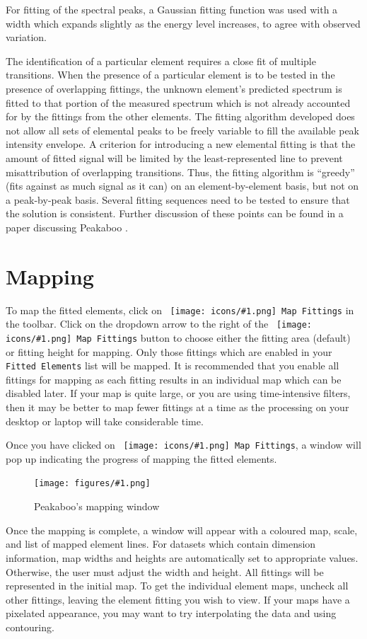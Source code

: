 \documentclass[article,twoside,11pt]{report}
\newcommand{\command}[1]{\texttt{#1}}
\newcommand{\icon}[1]{\texttt{[image: icons/\#1.png]}}
\newcommand{\button}[2]{\ \command{\icon{#1} #2}}
\newcommand{\screenshot}[2]{%
\begin{figure}[h!]
\centering\texttt{[image: figures/\#1.png]}
\caption{#2}
\end{figure}
}
\newcommand{\tocchapter}[1]{\cleardoublepage\chapter*{#1}\addcontentsline{toc}{chapter}{#1}}
\begin{document}
For fitting of the spectral peaks, a Gaussian fitting function was used with a width which
expands slightly as the energy level increases, to agree with observed variation.

The identification of a particular element requires a close fit of multiple transitions. 
When the presence of a particular element is to be tested in the presence of overlapping 
fittings, the unknown element’s predicted spectrum is fitted to that portion of the 
measured spectrum which is not already accounted for by the fittings from the other 
elements. The fitting algorithm developed does not allow all sets of elemental peaks to 
be freely variable to fill the available peak intensity envelope. A criterion for 
introducing a new elemental fitting is that the amount of fitted signal will be limited 
by the least-represented line to prevent misattribution of overlapping transitions. Thus, the 
fitting algorithm is ``greedy'' (fits against as much signal as it can) on an 
element-by-element basis, but not on a peak-by-peak basis. Several fitting sequences 
need to be tested to ensure that the solution is consistent. Further discussion of these 
points can be found in a paper discussing Peakaboo \cite{mcintyre}.


\tocchapter{Mapping}

To map the fitted elements, click on \button{map}{Map Fittings} in the toolbar. 
Click on the dropdown arrow to the right of the \button{map}{Map Fittings} button to 
choose either the fitting area (default) or fitting height for mapping. Only those 
fittings which are enabled in your \command{Fitted Elements} list will be mapped. It 
is recommended that you enable all fittings for mapping as each fitting results in 
an individual map which can be disabled later. If your map is quite large, or you 
are using time-intensive filters, then it may be better to map fewer fittings at a 
time as the processing on your desktop or laptop will take considerable time.

Once you have clicked on \button{map}{Map Fittings}, a window will pop up indicating the
progress of mapping the fitted elements.

\screenshot{map-window}{Peakaboo's mapping window}

Once the mapping is complete, a window will appear with a coloured map, scale, and 
list of mapped element lines. For datasets which contain dimension information, map 
widths and heights are automatically set to appropriate values. Otherwise, the user 
must adjust the width and height. All fittings will be represented in the initial map. 
To get the individual element maps, uncheck all other fittings, leaving the element 
fitting you wish to view. If your maps have a pixelated appearance, you may want to 
try interpolating the data and using contouring.
\end{document}
